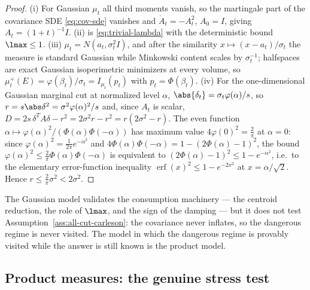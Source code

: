 \documentclass[../../main.tex]{subfiles}
\begin{document}
\begin{proof}
(i) For Gaussian $\mu_t$ all third moments vanish, so the martingale part of the covariance
SDE \eqref{eq:cov-sde} vanishes and $\dot A_t=-A_t^2$, $A_0=I$, giving $A_t=(1+t)^{-1}I$.
(ii) is \eqref{eq:trivial-lambda} with the deterministic bound $\lmax\le1$.
(iii) $\mu_t=N(a_t,\sigma_t^2I)$, and after the similarity $x\mapsto(x-a_t)/\sigma_t$ the
measure is standard Gaussian while Minkowski content scales by $\sigma_t^{-1}$; halfspaces are
exact Gaussian isoperimetric minimizers at every volume, so
$\mu_t^+(E)=\varphi(\beta_t)/\sigma_t=I_{\mu_t}(p_t)$ with $p_t=\Phi(\beta_t)$.
(iv) For the one-dimensional Gaussian marginal cut at normalized level $\alpha$,
$\abs{\delta_t}=\sigma_t\varphi(\alpha)/s$, so $r=s\abs\delta^2=\sigma^2\varphi(\alpha)^2/s$
and, since $A_t$ is scalar, $D=2s\,\delta^TA\delta-r^2=2\sigma^2r-r^2=r(2\sigma^2-r)$. The
even function $\alpha\mapsto\varphi(\alpha)^2/(\Phi(\alpha)\Phi(-\alpha))$ has maximum value
$4\varphi(0)^2=\tfrac2\pi$ at $\alpha=0$: since $\varphi(\alpha)^2=\tfrac1{2\pi}e^{-\alpha^2}$ and
$4\Phi(\alpha)\Phi(-\alpha)=1-(2\Phi(\alpha)-1)^2$, the bound
$\varphi(\alpha)^2\le\tfrac2\pi\Phi(\alpha)\Phi(-\alpha)$ is equivalent to
$(2\Phi(\alpha)-1)^2\le1-e^{-\alpha^2}$, i.e.\ to the elementary error-function inequality
$\operatorname{erf}(x)^2\le1-e^{-2x^2}$ at $x=\alpha/\sqrt2$. Hence
$r\le\tfrac2\pi\sigma^2<2\sigma^2$.
\end{proof}

\begin{remark}
The Gaussian model validates the consumption machinery --- the centroid reduction, the role of
$\lmax$, and the sign of the damping --- but it does not test
Assumption~\ref{ass:all-cut-carleson}: the covariance never inflates, so the dangerous regime
is never visited. The model in which the dangerous regime is provably visited while the answer
is still known is the product model.
\end{remark}

\subsection{Product measures: the genuine stress test}
\end{document}
